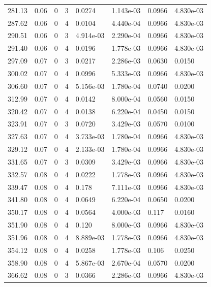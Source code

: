 \documentclass[preview]{standalone}
\begin{document}
{{{\begin{tabular}{L{1.2cm}C{1.2cm} C{0.3cm}C{0.5cm} C{1.4cm}C{1.4cm} C{1.4cm}C{1.4cm}}
  281.13  &  0.06  & 0     &  3 &  0.0274  & 1.143e-03  & 0.0966 &  4.830e-03   \\ 
  287.62  &  0.06  & 0     &  4 &  0.0104  & 4.440e-04  & 0.0966 &  4.830e-03   \\ 
  290.51  &  0.06  & 0     &  3 &  4.914e-03  & 2.290e-04  & 0.0966 &  4.830e-03   \\ 
  291.40  &  0.06  & 0     &  4 &  0.0196  & 1.778e-03  & 0.0966 &  4.830e-03   \\ 
  297.09  &  0.07  & 0     &  3 &  0.0217  & 2.286e-03  & 0.0630 &  0.0150   \\ 
  300.02  &  0.07  & 0     &  4 &  0.0996  & 5.333e-03  & 0.0966 &  4.830e-03   \\ 
  306.60  &  0.07  & 0     &  4 &  5.156e-03  & 1.780e-04  & 0.0740 &  0.0200   \\ 
  312.99  &  0.07  & 0     &  4 &  0.0142  & 8.000e-04  & 0.0560 &  0.0150   \\ 
  320.42  &  0.07  & 0     &  4 &  0.0138  & 6.220e-04  & 0.0450 &  0.0150   \\ 
  323.91  &  0.07  & 0     &  3 &  0.0720  & 3.429e-03  & 0.0570 &  0.0100   \\ 
  327.63  &  0.07  & 0     &  4 &  3.733e-03  & 1.780e-04  & 0.0966 &  4.830e-03   \\ 
  329.12  &  0.07  & 0     &  4 &  2.133e-03  & 1.780e-04  & 0.0966 &  4.830e-03   \\ 
  331.65  &  0.07  & 0     &  3 &  0.0309  & 3.429e-03  & 0.0966 &  4.830e-03   \\ 
  332.57  &  0.08  & 0     &  4 &  0.0222  & 1.778e-03  & 0.0966 &  4.830e-03   \\ 
  339.47  &  0.08  & 0     &  4 &  0.178  & 7.111e-03  & 0.0966 &  4.830e-03   \\ 
  341.80  &  0.08  & 0     &  4 &  0.0649  & 6.220e-04  & 0.0650 &  0.0200   \\ 
  350.17  &  0.08  & 0     &  4 &  0.0564  & 4.000e-03  & 0.117 &  0.0160   \\ 
  351.90  &  0.08  & 0     &  4 &  0.120  & 8.000e-03  & 0.0966 &  4.830e-03   \\ 
  351.96  &  0.08  & 0     &  4 &  8.889e-03  & 1.778e-03  & 0.0966 &  4.830e-03   \\ 
  354.12  &  0.08  & 0     &  4 &  0.0258  & 1.778e-03  & 0.106 &  0.0250   \\ 
  358.90  &  0.08  & 0     &  4 &  5.867e-03  & 2.670e-04  & 0.0570 &  0.0200   \\ 
  366.62  &  0.08  & 0     &  3 &  0.0366  & 2.286e-03  & 0.0966 &  4.830e-03   \\ 

\end{tabular}}}}
\end{document}
